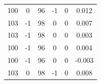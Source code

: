 \documentclass[a4paper, 12pt]{article}
\begin{document}
\begin{table}[H]
\begin{tabular}{@{}cccccc@{}}
    100          & 0            & 96       & -1       & 0        & 0.012      \\
    103          & -1           & 98       & 0        & 0        & 0.007      \\
    103          & -1           & 98       & 0        & 0        & 0.003      \\
    100          & -1           & 96       & 0        & 0        & 0.004      \\
    100          & -1           & 96       & 0        & 0        & -0.003     \\
    103          & 0            & 98       & -1       & 0        & 0.008      \\ \bottomrule
    \end{tabular}
    \end{table}
\end{document}
